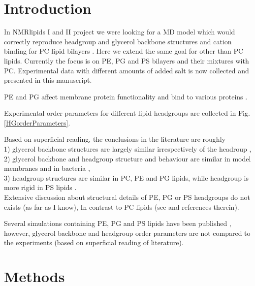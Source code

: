 \documentclass[aps,prl,superscriptaddress,twocolumn]{revtex4}
\begin{document}
\section{Introduction}

In NMRlipids I and II project we were looking for a MD model
which would correctly reproduce headgroup and glycerol
backbone structures and cation binding for PC lipid bilayers \cite{botan15,catte16}.
Here we extend the same goal for other than PC lipids.
Currently the focus is on PE, PG and PS bilayers and their
mixtures with PC. Experimental data with different amounts of 
added salt is now collected and presented in this manuscript.

PE and PG affect membrane protein functionality \cite{hariharan18} and bind to various proteins \cite{yeagle14}.




Experimental order parameters for different lipid headgroups are
collected in Fig. \ref{HGorderParameters}. 

Based on superficial reading, the conclusions in the literature are roughly \\ 
1) glycerol backbone structures are largely similar irrespectively of the headroup \cite{gally81}, \\
2) glycerol backbone and headgroup structure and behaviour are similar in model membranes and in bacteria \cite{gally81,scherer87,seelig90}, \\
3) headgroup structures are similar in PC, PE and PG lipids, while headgroup is more rigid in PS lipids \cite{wohlgemuth80,buldt81}. \\
Extensive discussion about structural details of PE, PG or PS headgroups do not exists (as far as I know), 
In contrast to PC lipids (see \cite{botan15} and references therein).



Several simulations containing PE, PG and PS lipids have been published \cite{??}, 
however, glycerol backbone and headgroup order parameters are not compared to
the experiments (based on superficial reading of literature).

\section{Methods}
\end{document}
